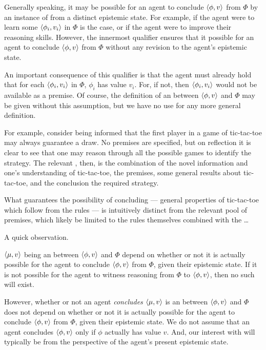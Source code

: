 \begin{note}
  Generally speaking, it may be possible for an agent to conclude \(\langle \phi, v \rangle\) from \(\Phi\) by an instance of \adA{} from a distinct epistemic state.
  For example, if the agent were to learn some \(\langle \phi_{i}, v_{i} \rangle\) in \(\Phi\) is the case, or if the agent were to improve their reasoning skills.
  However, the innermost qualifier ensures that it possible for an agent to conclude \(\langle \phi, v \rangle\) from \(\Phi\) without any revision to the agent's epistemic state.

  An important consequence of this qualifier is that the agent must already hold that for each \(\langle \phi_{i}, v_{i} \rangle\) in \(\Phi\), \(\phi_{i}\) has value \(v_{i}\).
  For, if not, then \(\langle \phi_{i}, v_{i} \rangle\) would not be available as a premise.
  Of course, the definition of an \itp{} between \(\langle \phi, v \rangle\) and \(\Phi\) may be given without this assumption, but we have no use for any more general definition.
\end{note}

\begin{note}[\illu{2}]
  \color{red}
    For example, consider being informed that the first player in a game of tic-tac-toe may always guarantee a draw.
  No premises are specified, but on reflection it is clear to see that one may reason through all the possible games to identify the strategy.
  The relevant , then, is the combination of the novel information and one's understanding of tic-tac-toe, the premises, some general results about tic-tac-toe, and the conclusion the required strategy.

  What guarantees the possibility of concluding --- general properties of tic-tac-toe which follow from the rules --- is intuitively distinct from the relevant pool of premises, which likely be limited to the rules themselves combined with the \dots

\end{note}

\begin{note}
  A quick observation.

  \(\langle \mu, v \rangle\) being an \itp{} between \(\langle \phi, v \rangle\) and \(\Phi\) depend on whether or not it is actually possible for the agent to conclude \(\langle \phi, v \rangle\) from \(\Phi\), given their epistemic state.
  If it is not possible for the agent to witness reasoning from \(\Phi\) to \(\langle \phi, v \rangle\), then no such \itp{} will exist.

  However, whether or not an agent \emph{concludes} \(\langle \mu, v \rangle\) is an \itp{} between \(\langle \phi, v \rangle\) and \(\Phi\) does not depend on whether or not it is actually possible for the agent to conclude \(\langle \phi, v \rangle\) from \(\Phi\), given their epistemic state.
  We do not assume that an agent concludes \(\langle \phi, v \rangle\) only if \(\phi\) actually has value \(v\).
  And, our interest with  will typically be from the perspective of the agent's present epistemic state.
\end{note}

